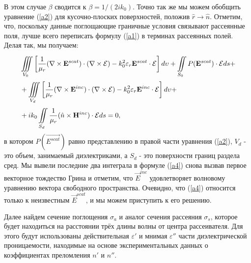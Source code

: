 В этом случае $ \beta $ сводится к $ \beta = 1/(2 i k_{0}) $. Точно так же мы можем обобщить уравнение (\ref{a2}) для кусочно-плоских поверхностей, положив $ \hat{r} \rightarrow \hat{n} $. Отметим, что, поскольку данные поглощающие граничные условия связывают рассеянные поля, лучше всего переписать формулу (\ref{a1}) в терминах рассеянных полей. Делая так, мы получаем:
\begin{align}\label{a4}
	&\iiint\limits_{V_{0}}^{} \left[ \dfrac{1}{\mu_{r}}(\nabla \times \vec{E}^{scat}) \cdot (\nabla \times \vec{\cal{E}}) - k_{0}^{2} \varepsilon_{r}\vec{E}^{scat} \cdot \vec{\cal{E}} \right]d\upsilon + 
	\iint\limits_{S_{0}}^{}  P(\vec{E}^{scat}) \cdot \vec{\cal{E}}ds +\notag\\
	&+ 
	\iiint\limits_{V_{d}}^{} \left[ \dfrac{1}{\mu_{r}}(\nabla \times \vec{E}^{inc}) \cdot (\nabla \times \vec{\cal{E}}) - k_{0}^{2} \varepsilon_{r}\vec{E}^{inc} \cdot \vec{\cal{E}} \right]d\upsilon +\notag\\
	&+ i k_{0}\iint\limits_{S_{d}}^{} \dfrac{1}{\mu_{r}}(\hat{n} \times \vec{H}^{inc}) \cdot \vec{\cal{E}}ds = 0,
\end{align}
в котором $P(\vec{E^{scat}})$ равно представлению в правой части уравнения (\ref{a2}), $ V_{d} $ - это объем, занимаемый диэлектриками, а $ S_{d} $ - это поверхности границ раздела сред. Мы вывели последние два интеграла в формуле (\ref{a4}) снова вызвав первое векторное тождество Грина и отметим, что ${ \vec E}^{inc} $ удовлетворяет волновому уравнению вектора свободного пространства. Очевидно, что (\ref{a4}) относится только к неизвестным $ {\vec E}^{scat}$, и мы можем приступить к его решению.



Далее найдем сечение поглощения $ \sigma_a $ и аналог сечения рассеяния $ \sigma_s $, которое будет находиться на расстоянии трёх длины волны от центра рассеивателя. Для этого будут использованы действительная $ \varepsilon' $ и мнимая $ \varepsilon'' $ части диэлектрической проницаемости, находимые на основе экспериментальных данных о коэффициентах преломления $ n' $ и $ n'' $.

